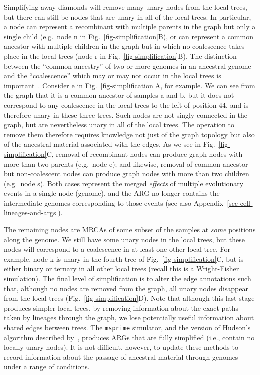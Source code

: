 \documentclass{article}
\newcommand{\noderef}[1]{\textsf{#1}}
\begin{document}
Simplifying away diamonds will remove many unary nodes from the
local trees, but there can still be nodes that are unary in all
of the local trees. In particular, a node can represent a recombinant
with multiple parents in the graph but only a single child (e.g.\ node \noderef{n}
in Fig.~\ref{fig-simplification}B), or can represent a common ancestor with
multiple children in the graph but in which no coalescence takes place
in the local trees
(node \noderef{r} in Fig.~\ref{fig-simplification}B).
The distinction between the ``common ancestry'' of two or more genomes
in an ancestral genome and the ``coalescence'' which may or may
not occur in the local trees is
important~\citep{hudson1983testing,kelleher2016efficient}.
Consider \noderef{e} in Fig.~\ref{fig-simplification}A,
for example. We can see from the graph that it is a common
ancestor of samples \noderef{a} and \noderef{b}, but
it does not correspond to any coalescence in the
local trees to the left of position $44$, and is therefore
unary in these three trees.
Such nodes are not singly connected in the graph, but are nevertheless unary in
all of the local trees.
The operation to remove them
therefore requires knowledge not just of the graph topology but also of the
ancestral material associated with the edges.
As we see in Fig.~\ref{fig-simplification}C,
removal of recombinant nodes can produce graph nodes with
more than two parents (e.g.~node \noderef{e}); and likewise, removal of
common ancestor but non-coalescent nodes can produce graph nodes with
more than two children (e.g.~node \noderef{s}). Both cases represent the
merged
\emph{effects} of multiple evolutionary events in a single node (genome), and the
ARG no longer contains the intermediate genomes corresponding to
those events (see also Appendix~\ref{sec-cell-lineages-and-args}).

The remaining nodes are MRCAs of some subset of the samples
at \emph{some} positions along the genome. We still have
some unary nodes in the local trees, but these nodes will
correspond to a coalescence in at least one other
local tree. For example, node  \noderef{k} is unary in the fourth tree
of Fig.~\ref{fig-simplification}C, but is either binary
or ternary in all other local trees (recall this is a Wright-Fisher
simulation). The final level of simplification is to alter the edge annotations
such that, although no nodes are removed from the graph, all
unary nodes disappear from the local trees (Fig.~\ref{fig-simplification}D).
Note that although this last stage produces simpler local trees, by
removing information about the exact paths taken by lineages through
the graph, we lose potentially useful information about shared edges
between trees.
The \texttt{msprime} simulator, and the version of Hudson's algorithm described
by~\citet{kelleher2016efficient}, produces ARGs
that are fully simplified (i.e., contain no locally unary nodes).
It is not difficult, however, to update
these methods to record information about the passage of ancestral
material through genomes under a range of conditions.
\end{document}
